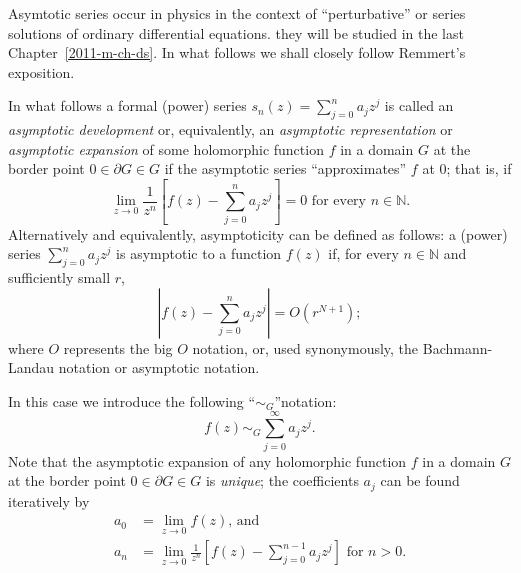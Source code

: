 Asymtotic series
occur in physics in the context of ``perturbative'' or series solutions of ordinary differential equations.
they will be studied in the last Chapter~\ref{2011-m-ch-ds}.
In what follows we shall closely follow Remmert's exposition.\cite[-0mm]{Remmert-1991-tocf}

In what follows a formal (power) series $s_n(z) =\sum_{j=0}^n a_j z^j$
is called an {\em asymptotic development}
or, equivalently, an
{\em asymptotic representation}
 or
{\em asymptotic expansion}
of some holomorphic function $f$
in a domain $G$ at the border point $0 \in \partial G \in G$ if  the asymptotic series ``approximates'' $f$ at $0$; that is, if
 \begin{equation}
\lim_{z\rightarrow 0} \frac{1}{z^n}\left[ f(z) - \sum_{j=0}^n a_j z^j  \right] =0
\text{ for every } n\in \mathbb{N}.
 \end{equation}
Alternatively and equivalently,
asymptoticity
 can be defined as follows:\cite[-0mm]{Olver-1997,Bender-Orszag,Boyd99thedevil}
a (power) series $\sum_{j=0}^n a_j z^j$ is asymptotic to a function $f(z)$
if, for every $n\in \mathbb{N}$ and sufficiently small $r$,
\begin{equation}
\left| f(z) - \sum_{j=0}^n a_j z^j  \right| = O\left( r^{N+1} \right)
;
 \end{equation}
where $O$ represents the
big $O$ notation,
or, used synonymously,
the Bachmann-Landau notation or asymptotic notation.

In this case we introduce the following ``$\sim_G$''notation:
 \begin{equation}
f(z) \sim_G  \sum_{j=0}^\infty a_j z^j.
\label{2019-mm-ch-ca-ritt}
 \end{equation}
Note that the asymptotic expansion of any holomorphic function $f$ in a domain $G$ at the border point $0 \in \partial G \in G$
is {\em unique}; the coefficients $a_j$ can be found iteratively by
\begin{align*}
a_0 &= \lim_{z \rightarrow 0} f(z)\text{, and} \\
a_n &= \lim_{z\rightarrow 0} \frac{1}{z^n}\left[ f(z) - \sum_{j=0}^{n-1} a_j z^j  \right]
\text{ for } n>0.
\end{align*}




